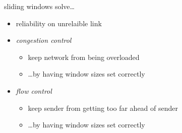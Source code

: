 \begin{frame}{sliding windows solve\ldots}
    \begin{itemize}
    \item reliability on unrelaible link
    \item \textit{congestion control}
        \begin{itemize}
        \item keep network from being overloaded
        \item \ldots by having window sizes set correctly
        \end{itemize}
    \item \textit{flow control}
        \begin{itemize}
        \item keep sender from getting too far ahead of sender
        \item \ldots by having window sizes set correctly
        \end{itemize}
    \end{itemize}
\end{frame}
